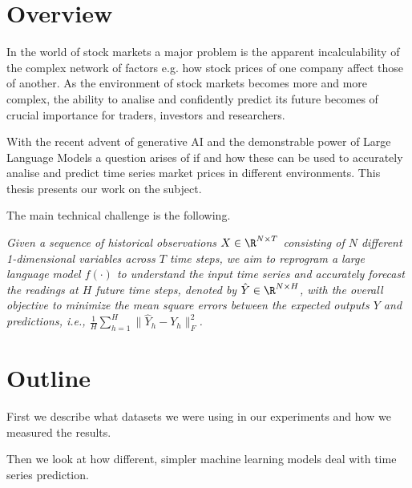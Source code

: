 \section{Overview}
In the world of stock markets a major problem is the apparent incalculability of the complex network of factors e.g. how stock prices of one company affect those of another. As the environment of stock markets becomes more and more complex, the ability to analise and confidently predict its future becomes of crucial importance for traders, investors and researchers.

With the recent advent of generative AI and the demonstrable power of Large Language Models a question arises of if and how these can be used to accurately analise and predict time series market prices in different environments. This thesis presents our work on the subject.

The main technical challenge is the following.

\textit{Given a sequence of historical observations \(X \in \R^{N\times T}\)
	consisting of \(N\) different 1-dimensional variables across \(T\) time steps, we aim to reprogram a large
	language model \(f(\cdot)\) to understand the input time series and accurately forecast the readings at \(H\) future time steps, denoted by \(\hat{Y} \in \R^{N\times H}\),
	with the overall objective to minimize the mean square errors between the expected outputs \(Y\) and predictions, i.e., \(\frac1H \sum_{h=1}^H \| \hat{Y}_h - Y_h \|_F^2 \).} \cite{reprogramming_llm}

\section{Outline} %
First we describe what datasets we were using in our experiments and how we measured the results.

Then we look at how different, simpler machine learning models deal with time series prediction.



